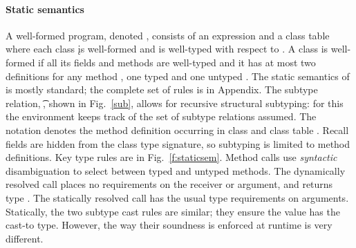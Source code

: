 \documentclass[acmlarge, anonymous, authordraft, review]{acmart} %
\begin{document}
\paragraph{Static semantics}
A well-formed program, denoted \WFp\e\K, consists of an expression \e and a
class table \K where each class \k is well-formed and \e is well-typed with
respect to \K.  A class is well-formed if all its fields and methods are
well-typed and it has at most two definitions for any method \m, one typed
\Mdef\m\x\C\D\e and one untyped \Mdef\m\x\any\any\e.  The static semantics
of \kafka is mostly standard; the complete set of rules is in Appendix.  The
subtype relation, \StrSub\M\K\t\tp, shown in Fig.~\ref{sub}, allows for
recursive structural subtyping: for this the environment \M keeps track of
the set of subtype relations assumed.  The notation \md\In\App\K\C denotes
the method definition \md occurring in class \C and class table \K.  Recall
fields are hidden from the class type signature, so subtyping is limited to
method definitions.  Key type rules are in Fig.~\ref{f:staticsem}.  Method
calls use \emph{syntactic} disambiguation to select between typed and
untyped methods. The dynamically resolved call places no requirements on the
receiver or argument, and returns type \any.  The statically resolved call
has the usual type requirements on arguments. Statically, the two subtype
cast rules are similar; they ensure the value has the cast-to type. However,
the way their soundness is enforced at runtime is very different.
\end{document}
